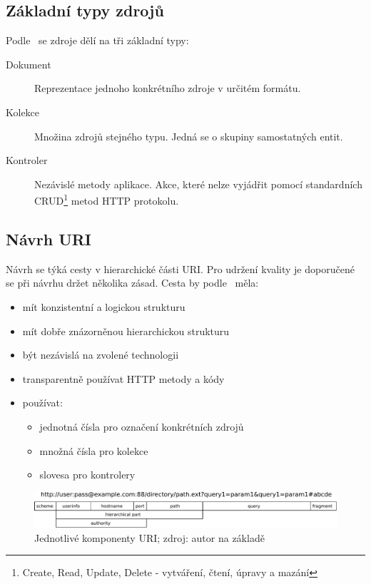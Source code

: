 \subsection{Základní typy zdrojů}

Podle~\cite{rest_vse} se zdroje dělí na tři základní typy:

\begin{description}
  \item[Dokument] Reprezentace jednoho konkrétního zdroje v určitém formátu.
  \item[Kolekce] Množina zdrojů stejného typu. Jedná se o skupiny samostatných entit.
  \item[Kontroler] Nezávislé metody aplikace. Akce, které nelze vyjádřit pomocí standardních
  CRUD\footnote{Create, Read, Update, Delete - vytváření, čtení, úpravy a mazání} metod HTTP protokolu.
\end{description}

\subsection{Návrh URI}

Návrh se týká cesty v hierarchické části URI. Pro udržení kvality je doporučené se při návrhu držet několika zásad. Cesta by podle~\cite{rest_vse} měla:
    
\begin{itemize}
\item mít konzistentní a logickou strukturu
\item mít dobře znázorněnou hierarchickou strukturu
\item být nezávislá na zvolené technologii
\item transparentně používat HTTP metody a kódy
\item používat:
\begin{itemize}
\item jednotná čísla pro označení konkrétních zdrojů
\item množná čísla pro kolekce
\item slovesa pro kontrolery
\end{itemize}
\end{itemize}

\begin{figure}[ht!]
  \centering
  \includegraphics[width=130mm]{./images/uri.pdf}
  \caption{Jednotlivé komponenty URI; zdroj: autor na základě~\cite{uri}\label{overflow}}
\end{figure}

